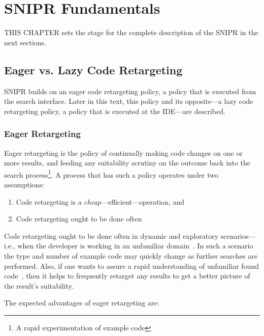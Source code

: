 \chapter{\uppercase{SnipR} Fundamentals}{}
\label{sec:fundamentals}


\lettrine[lraise=0.1, nindent=0em, slope=-.5em]{T} {HIS CHAPTER} sets the stage for the complete description of the \uppercase{SnipR} in the next sections.

\section{Eager vs. Lazy Code Retargeting}
\label{sec:eagervslazy}

\uppercase{SnipR} builds on an eager code retargeting policy, a policy that is executed from the search interface. Later in this text, this policy and its opposite---a lazy code retargeting policy, a policy that is executed at the IDE---are described.

\subsection{Eager Retargeting}

Eager retargeting is the policy of continually making code changes on one or more results, and feeding any suitability scrutiny on the outcome back into the search process\footnote{A rapid experimentation of example code}. A process that has such a policy operates under two assumptions:

\begin{enumerate}
	\item Code retargeting is a \emph{cheap}---efficient---operation, and
	\item Code retargeting ought to be done often
\end{enumerate}

Code retargeting ought to be done often in dynamic and exploratory scenarios---i.e., when the developer is working in an unfamiliar domain~\cite{Brandt:2009ew}. In such a scenario the type and number of example code may quickly change as further searches are performed. Also, if one wants to assure a rapid understanding of unfamiliar found code~\cite{Brandt:2009ew}, then it helps to frequently retarget any results to get a better picture of the result's suitability.

The expected advantages of eager retargeting are:

